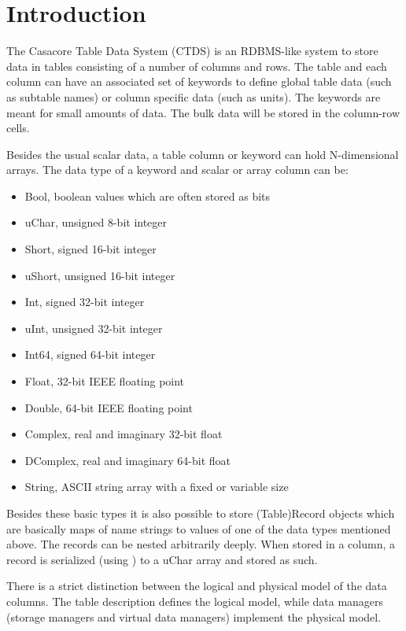

\section{Introduction}
The Casacore Table Data System (CTDS) is an RDBMS-like system to store data in
tables consisting of a number of columns and rows. The
table and each column can have an associated set of keywords
to define global table data (such as subtable names) or column specific data (such as units).
The keywords are meant for small amounts of data. The bulk data will
be stored in the column-row cells.

Besides the usual scalar data, a table column or keyword can hold
N-dimensional arrays.
The data type of a keyword and scalar or array column can be:
\begin{itemize}
\item Bool, boolean values which are often stored as bits
\item uChar, unsigned 8-bit integer
\item Short, signed 16-bit integer
\item uShort, unsigned 16-bit integer
\item Int, signed 32-bit integer
\item uInt, unsigned 32-bit integer
\item Int64, signed 64-bit integer
\item Float, 32-bit IEEE floating point
\item Double, 64-bit IEEE floating point
\item Complex, real and imaginary 32-bit float
\item DComplex, real and imaginary 64-bit float
\item String, ASCII string array with a fixed or variable size
\end{itemize}

Besides these basic types it is also possible to store (Table)Record
objects which are basically maps of name strings to values of one of the data
types mentioned above. The records can be nested arbitrarily deeply.
When stored in a column, a record is serialized (using
) to a uChar array and stored as such.

There is a strict distinction between the logical and physical
model of the data columns.
The table description defines the logical model, while data managers
(storage managers and virtual data managers) implement the physical
model.

